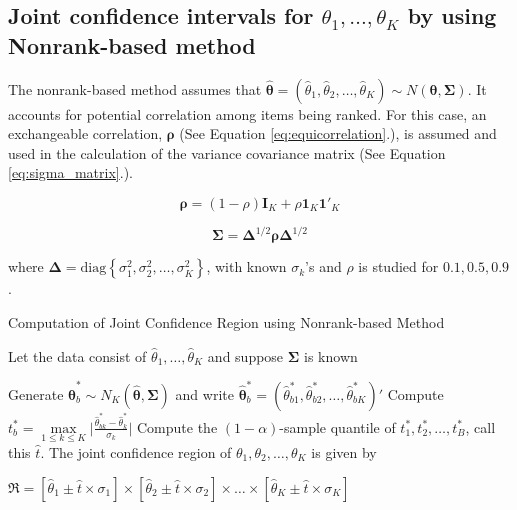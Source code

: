 \documentclass[
  12pt,
  a4paper,
]{article}
\numberwithin{equation}{section}
\begin{document}
\subsection{\texorpdfstring{Joint confidence intervals for \(\theta_1, \dots, \theta_K\) by using Nonrank-based method}{Joint confidence intervals for \textbackslash theta\_1, \textbackslash dots, \textbackslash theta\_K by using Nonrank-based method}}\label{sec:nonrankbased}

The nonrank-based method assumes that \(\boldsymbol{\hat\theta} = \left(\hat\theta_1, \hat\theta_2, \dots, \hat\theta_K\right) \sim N \left( \boldsymbol{\theta}, \boldsymbol{\Sigma}\right)\). It accounts for potential correlation among items being ranked. For this case, an exchangeable correlation, \(\boldsymbol{\rho}\) (See Equation \ref{eq:equicorrelation}.), is assumed and used in the calculation of the variance covariance matrix (See Equation \ref{eq:sigma_matrix}.).

\begin{equation}
  \boldsymbol{\rho} = \left( 1-\rho \right) \mathbf{I}_K + \rho \boldsymbol{1}_K \boldsymbol{1}'_K
  \label{eq:equicorrelation}
\end{equation}

\begin{equation}
  \boldsymbol{\Sigma} = \boldsymbol{\Delta}^{1/2} \boldsymbol{\rho} \boldsymbol{\Delta}^{1/2}
  \label{eq:sigma_matrix}
\end{equation}

where \(\boldsymbol{\Delta} = \text{diag} \left\{ \sigma^2_1, \sigma^2_2, \dots, \sigma^2_K \right\}\), with known \(\sigma_k\)'s and \(\rho\) is studied for \(0.1, 0.5, 0.9\).

\begin{algorithm}[H]
    \caption{Computation of Joint Confidence Region using Nonrank-based Method} 
    \label{alg:nonrank_ci}
    Let the data consist of $\hat \theta_1, \dots, \hat \theta_K$ and suppose $\boldsymbol{\Sigma}$ is known
    \begin{algorithmic}[1]
                \State Generate $\boldsymbol{\hat\theta}^*_b \sim N_K \left( \boldsymbol{\hat\theta}, \boldsymbol{\Sigma}\right)$ and write $\boldsymbol{\hat\theta}^*_b = \left( \hat\theta^*_{b1}, \hat\theta^*_{b2}, \dots, \hat\theta^*_{bK} \right)' $
                \State Compute $t^*_b = \underset{1 \leq k \leq K}{\max} \Bigg| \frac{\hat\theta^*_{bk} - \hat\theta^*_{k}}{\sigma_k} \Bigg|$
        \EndFor
        \State Compute the $\left(1-\alpha\right)$-sample quantile of $t^*_1, t^*_2, \dots, t^*_B$, call this $\hat{t}$.
        \State The joint confidence region of $\theta_1, \theta_2, \dots, \theta_K$ is given by 
        \Statex \begin{minipage}{\linewidth}
    \centering
$\mathfrak{R} = \left[ \hat\theta_1 \pm \hat t \times \sigma_1  \right] \times \left[ \hat\theta_2 \pm \hat t \times \sigma_2  \right] \times \dots \times \left[ \hat\theta_K \pm \hat t \times \sigma_K  \right]$
    \end{minipage}
    \end{algorithmic} 
\end{algorithm}
\end{document}
